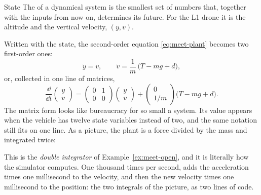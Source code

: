 \begin{definition}{State}
The  of a dynamical system is the smallest set of numbers that, together with the inputs from now on, determines its future. For the L1 drone it is the altitude and the vertical velocity, $(y, v)$.
\end{definition}

Written with the state, the second-order equation \eqref{eq:meet-plant} becomes two first-order ones:
\begin{equation*}
  \dot y = v, \qquad \dot v = \frac{1}{m}\,\big(T - m g + d\big),
\end{equation*}
or, collected in one line of matrices,
\begin{equation}\label{eq:meet-state}
  \frac{\dd}{\dd t}\begin{pmatrix} y \\ v \end{pmatrix}
  = \begin{pmatrix} 0 & 1 \\ 0 & 0 \end{pmatrix}\begin{pmatrix} y \\ v \end{pmatrix}
  + \begin{pmatrix} 0 \\ 1/m \end{pmatrix}\big(T - m g + d\big).
\end{equation}
The matrix form looks like bureaucracy for so small a system. Its value appears when the vehicle has twelve state variables instead of two, and the same notation still fits on one line. As a picture, the plant is a force divided by the mass and integrated twice:
\begin{center}
\end{center}
This is the \emph{double integrator} of Example~\ref{ex:meet-open}, and it is literally how the simulator computes. One thousand times per second,  adds the acceleration times one millisecond to the velocity, and then the new velocity times one millisecond to the position: the two integrals of the picture, as two lines of code.

